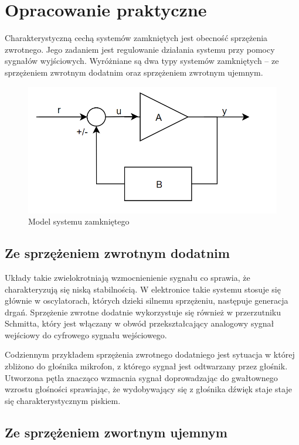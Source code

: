 \documentclass{article}
\begin{document}
\section{Opracowanie praktyczne}

\quad Charakterystyczną cechą systemów zamkniętych jest obecność sprzężenia zwrotnego. 
Jego zadaniem jest regulowanie działania systemu przy pomocy sygnałów wyjściowych. 
Wyróżniane są dwa typy systemów zamkniętych -- ze sprzężeniem zwrotnym dodatnim oraz sprzężeniem zwrotnym ujemnym.

\begin{figure}[h!]
\centering
\includegraphics[scale=0.4]{feedback.png}
\caption{Model systemu zamkniętego}
\label{fig:model}
\end{figure}

\subsection{Ze sprzężeniem zwrotnym dodatnim}


\quad Układy takie zwielokrotniają wzmocnienienie sygnału co sprawia, że charakteryzują się niską stabilnością. 
W elektronice takie systemu stosuje się głównie w oscylatorach, których dzieki silnemu sprzężeniu, następuje generacja drgań.
Sprzężenie zwrotne dodatnie wykorzystuje się również w przerzutniku Schmitta, który jest włączany w obwód przekształcający analogowy sygnał wejściowy do cyfrowego sygnału wejściowego.

Codziennym przykładem sprzężenia zwrotnego dodatniego jest sytuacja w której zbliżono do głośnika mikrofon, z którego sygnał jest odtwarzany przez głośnik. Utworzona pętla znacząco wzmacnia sygnał doprowadzając do gwałtownego wzrostu głośności sprawiając, że wydobywający się z głośnika dźwięk staje staje się charakterystycznym piskiem.

\subsection{Ze sprzężeniem zwortnym ujemnym}
\end{document}
